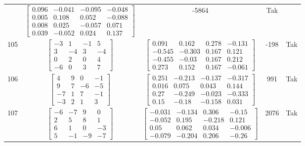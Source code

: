 \documentclass[a4paper,12pt]{article}
\begin{document}
\begin{tabular}{c c c c c}
&
$\begin{bmatrix} 0.096 & -0.041 & -0.095 & -0.048 \\ 0.005 & 0.108 & 0.052 & -0.088 \\ 0.008 & 0.025 & -0.057 & 0.071 \\ 0.039 & -0.052 & 0.024 & 0.137 \end{bmatrix}$
&
-5864
&
Tak
\\
105
&
$\begin{bmatrix} -3 & 1 & -1 & 5 \\ 3 & -4 & 3 & -4 \\ 0 & 2 & 0 & 4 \\ -6 & 0 & 3 & 7 \end{bmatrix}$
&
$\begin{bmatrix} 0.091 & 0.162 & 0.278 & -0.131 \\ -0.545 & -0.303 & 0.167 & 0.121 \\ -0.455 & -0.03 & 0.167 & 0.212 \\ 0.273 & 0.152 & 0.167 & -0.061 \end{bmatrix}$
&
-198
&
Tak
\\
106
&
$\begin{bmatrix} 4 & 9 & 0 & -1 \\ 9 & 7 & -6 & -5 \\ -7 & 1 & 7 & -1 \\ -3 & 2 & 1 & 3 \end{bmatrix}$
&
$\begin{bmatrix} 0.251 & -0.213 & -0.137 & -0.317 \\ 0.016 & 0.075 & 0.043 & 0.144 \\ 0.27 & -0.249 & -0.023 & -0.333 \\ 0.15 & -0.18 & -0.158 & 0.031 \end{bmatrix}$
&
991
&
Tak
\\
107
&
$\begin{bmatrix} -6 & -7 & 9 & 0 \\ 2 & 5 & 8 & 1 \\ 6 & 1 & 0 & -3 \\ 5 & -1 & -9 & -7 \end{bmatrix}$
&
$\begin{bmatrix} -0.031 & -0.134 & 0.306 & -0.15 \\ -0.052 & 0.195 & -0.218 & 0.121 \\ 0.05 & 0.062 & 0.034 & -0.006 \\ -0.079 & -0.204 & 0.206 & -0.26 \end{bmatrix}$
&
2076
&
Tak
\\

\end{tabular}
\end{document}
